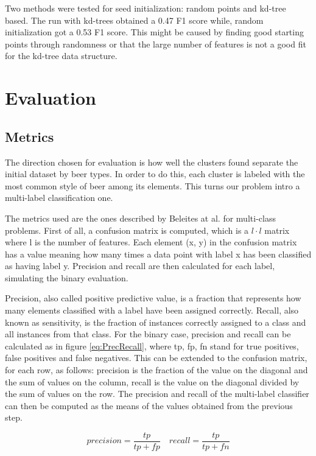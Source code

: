 \documentclass[12pt]{article}
\begin{document}
	Two methods were tested for seed initialization: random points and kd-tree based. The run with kd-trees obtained a 0.47 F1 score while, random initialization got a 0.53 F1 score. This might be caused by finding good starting points through randomness or that the large number of features is not a good fit for the kd-tree data structure.

	\section{Evaluation}
	\subsection{Metrics}
	The direction chosen for evaluation is how well the clusters found separate the initial dataset by beer types. In order to do this, each cluster is labeled with the most common style of beer among its elements. This turns our problem intro a multi-label classification one.
	
	The metrics used are the ones described by Beleites at al.\cite{MultilabelClassification} for multi-class problems. First of all, a confusion matrix is computed, which is a $l\cdot l$ matrix where l is the number of features. Each element (x, y) in the confusion matrix has a value meaning how many times a data point with label x has been classified as having label y. Precision and recall are then calculated for each label, simulating the binary evaluation. 
	
	Precision, also called positive predictive value, is a fraction that represents how many elements classified with a label have been assigned correctly. Recall, also known as sensitivity, is the fraction of instances correctly assigned to a class and all instances from that class. For the binary case, precision and recall can be calculated as in figure \ref{eq:PrecRecall}, where tp, fp, fn stand for true positives, false positives and false negatives. This can be extended to the confusion matrix, for each row, as follows: precision is the fraction of the value on the diagonal and the sum of values on the column, recall is the value on the diagonal divided by the sum of values on the row. The precision and recall of the multi-label classifier can then be computed as the means of the values obtained from the previous step.
	
	\begin{equation}
	\label{eq:PrecRecall}
	precision = \frac{tp}{tp + fp} \quad recall = \frac{tp}{tp + fn}
	\end{equation}
	
\end{document}
